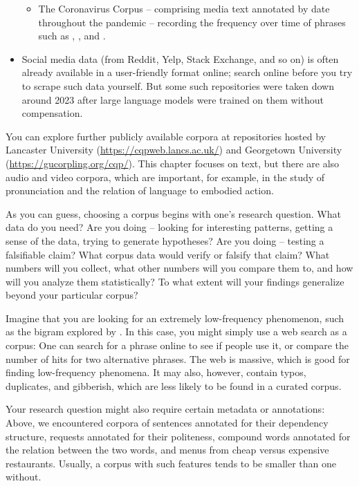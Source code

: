 \begin{itemize}
\begin{itemize}
\item The Coronavirus Corpus -- comprising media text annotated by
date throughout the  pandemic -- recording the frequency over
time of phrases such as , , and
.
\end{itemize}

\item Social media data (from Reddit, Yelp, Stack Exchange, and so on)
is often already available in a user-friendly format online; search online before you try to scrape such data yourself.  But some such repositories were taken down around 2023 after large language models were trained on them without compensation. 



\end{itemize}

You can explore further publicly available corpora at repositories hosted by Lancaster University (\url{https://cqpweb.lancs.ac.uk/}) and Georgetown University (\url{https://gucorpling.org/cqp/}).  This chapter focuses on text, but there are also audio and video
corpora, which are important, for example, in the study of
pronunciation and the relation of language to embodied action.

As you can guess,
choosing a corpus begins with one's research question.  What data do
you need?  Are you doing  -- looking for
interesting patterns, getting a sense of the data, trying to generate
hypotheses?  Are you doing  -- testing
a falsifiable claim?  What corpus data would verify or falsify that
claim?  What numbers will you collect, what other numbers will you
compare them to, and how will you analyze them statistically?  To what
extent will your findings generalize beyond your particular corpus?

Imagine that you are looking for an extremely low-frequency phenomenon,
such as the bigram  explored by
\citet{White:2021}. In this case, you might simply use a web search as
a corpus: One can search for a phrase online to see if people use it,
or compare the number of hits for two alternative phrases. The web is
massive, which is good for finding low-frequency phenomena. It may
also, however, contain typos, duplicates, and gibberish, which are
less likely to be found in a curated corpus.

Your research question might also require certain metadata or annotations: Above,  we encountered corpora of sentences annotated for their dependency structure,  requests annotated for their politeness, compound words annotated for the relation between the two
words, and menus from cheap versus expensive restaurants.   Usually, a corpus with such features tends to be smaller than one without.

